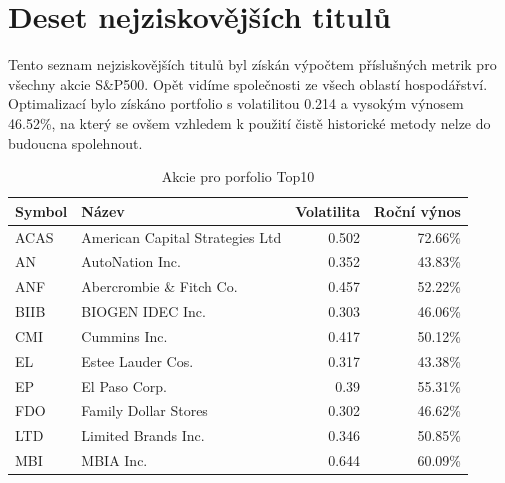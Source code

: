 \documentclass[a4paper,12pt]{report}
\begin{document}
  \clearpage
  \section{Deset nejziskovějších titulů}
    Tento seznam nejziskovějších titulů byl získán výpočtem příslušných metrik pro všechny akcie S\&P500. Opět vidíme společnosti ze všech oblastí hospodářství. Optimalizací bylo získáno portfolio s volatilitou 0.214 a vysokým výnosem 46.52\%, na který se ovšem vzhledem k použití čistě historické metody nelze do budoucna spolehnout.
    \begin{table}[htb]
      \centering
      \begin{tabular}{|l|l|r|r|}
        \hline
        Symbol&Název&Volatilita&Roční výnos\\\hline\hline
        ACAS&American Capital Strategies Ltd &0.502&72.66\%\\\hline
        AN&AutoNation Inc. &0.352&43.83\%\\\hline
        ANF&Abercrombie \& Fitch Co. &0.457&52.22\%\\\hline
        BIIB&BIOGEN IDEC Inc. &0.303&46.06\%\\\hline
        CMI&Cummins Inc. &0.417&50.12\%\\\hline
        EL&Estee Lauder Cos. &0.317&43.38\%\\\hline
        EP&El Paso Corp. &0.39&55.31\%\\\hline
        FDO&Family Dollar Stores &0.302&46.62\%\\\hline
        LTD&Limited Brands Inc. &0.346&50.85\%\\\hline
        MBI&MBIA Inc. &0.644&60.09\%\\\hline
      \end{tabular}
      \caption{Akcie pro porfolio Top10}
    \end{table}
\end{document}
